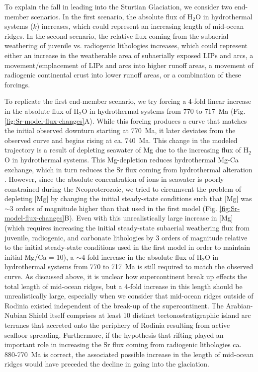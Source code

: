 To explain the fall in \SrSr leading into the Sturtian Glaciation, we consider two end-member scenarios. In the first scenario, the absolute flux of H$_{2}$O in hydrothermal systems ($k$) increases, which could represent an increasing length of mid-ocean ridges. In the second scenario, the relative flux coming from the subaerial weathering of juvenile vs. radiogenic lithologies increases, which could represent either an increase in the weatherable area of subaerially exposed LIPs and arcs, a movement/emplacement of LIPs and arcs into higher runoff areas, a movement of radiogenic continental crust into lower runoff areas, or a combination of these forcings.

To replicate the first end-member scenario, we try forcing a 4-fold linear increase in the absolute flux of H$_{2}$O in hydrothermal systems from 770 to 717~Ma (Fig. \ref{fig:Sr-model-flux-changes}A). While this forcing produces a \SrSr curve that matches the initial observed downturn starting at 770~Ma, it later deviates from the observed \SrSr curve and begins rising at ca. 740~Ma. This change in the modeled \SrSr trajectory is a result of depleting seawater of Mg due to the increasing flux of H$_{2}$O in hydrothermal systems. This Mg-depletion reduces hydrothermal Mg-Ca exchange, which in turn reduces the Sr flux coming from hydrothermal alteration \citep{Berndt1988a}. However, since the absolute concentration of ions in seawater is poorly constrained during the Neoproterozoic, we tried to circumvent the problem of depleting [Mg] by changing the initial steady-state conditions such that [Mg] was $\sim$3 orders of magnitude higher than that used in the first model (Fig. \ref{fig:Sr-model-flux-changes}B). Even with this unrealistically large increase in [Mg] (which requires increasing the initial steady-state subaerial weathering flux from juvenile, radiogenic, and carbonate lithologies by 3 orders of magnitude relative to the initial steady-state conditions used in the first model in order to maintain initial Mg/Ca = 10), a $\sim$4-fold increase in the absolute flux of H$_{2}$O in hydrothermal systems from 770 to 717~Ma is still required to match the observed \SrSr curve. As discussed above, it is unclear how supercontinent break up effects the total length of mid-ocean ridges, but a 4-fold increase in this length should be unrealistically large, especially when we consider that mid-ocean ridges outside of Rodinia existed independent of the break-up of the supercontinent. The Arabian-Nubian Shield itself comprises at least 10 distinct tectonostratigraphic island arc terranes that accreted onto the periphery of Rodinia \citep{Johnson2014a} resulting from active seafloor spreading. Furthermore, if the hypothesis that rifting played an important role in increasing the Sr flux coming from radiogenic lithologies ca. 880-770~Ma is correct, the associated possible increase in the length of mid-ocean ridges would have preceded the decline in \SrSr going into the glaciation.

